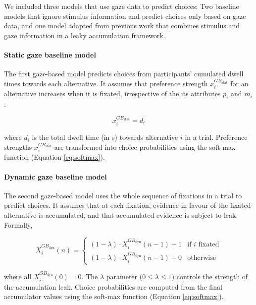 \documentclass[11pt, a4paper]{article}
\begin{document}
We included three models that use gaze data to predict choices: Two baseline models that ignore stimulus information and predict choices only based on gaze data, and one model adapted from previous work \parencite{glickman2019FormationPreferenceRisky} that combines stimulus and gaze information in a leaky accumulation framework.
\paragraph{Static gaze baseline model}

The first gaze-based model predicts choices from participants' cumulated dwell times towards each alternative. It assumes that preference strength $x_i^{GB_{\text{stat}}}$ for an alternative increases when it is fixated, irrespective of the its attributes $p_i$ and $m_i$:

\begin{equation}
    x_i^{GB_{\text{stat}}} = d_i
\end{equation}

where $d_i$ is the total dwell time (in s) towards alternative $i$ in a trial. Preference strengths $x_i^{GB_{\text{stat}}}$ are transformed into choice probabilities using the soft-max function (Equation \ref{eq:softmax}).

\paragraph{Dynamic gaze baseline model}

The second gaze-based model uses the whole sequence of fixations in a trial to predict choices. It assumes that at each fixation, evidence in favour of the fixated alternative is accumulated, and that accumulated evidence is subject to leak. Formally,

\begin{equation}
    X_i^{GB_{\text{dyn}}}(n) = \begin{cases}
             (1 - \lambda) \cdot X_i^{GB_{\text{dyn}}}(n - 1) + 1 &\text{if $i$ fixated}\\
             (1 - \lambda) \cdot X_i^{GB_{\text{dyn}}}(n - 1) + 0 &\text{otherwise}
             \end{cases}
\end{equation}

where all $X_i^{GB_{\text{dyn}}}(0) = 0$. The $\lambda$ parameter ($0 \le \lambda \le 1$) controls the strength of the accumulation leak.
Choice probabilities are computed from the final accumulator values using the soft-max function (Equation \ref{eq:softmax}).
\end{document}
